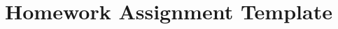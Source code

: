 \documentclass{article}
\newenvironment{q}
 {\item}
 {}
\newenvironment{soln}
 {\medskip\underline{\textbf{Solution:}}}
\begin{document}
\thispagestyle{empty}
\title{Homework Assignment Template}
\noindent Name:  %
\hfill Class and Section\\
Due Date: \hfill Homework Assignment \#

\bigskip

\begin{enumerate}[\bf(1)]

\begin{q}
Write Questions In This Environment \\ 
There are three different examples of environments for solutions.
\end{q}

\begin{soln}
\lipsum[2]
\end{soln}



\begin{q}
\lipsum[1]
\end{q}

\begin{proof}
\lipsum[2]
\end{proof}

\begin{q}
\lipsum[1]
\end{q}

\begin{tcolorbox}
\lipsum[2]
\end{tcolorbox}



\end{enumerate}
\end{document}
